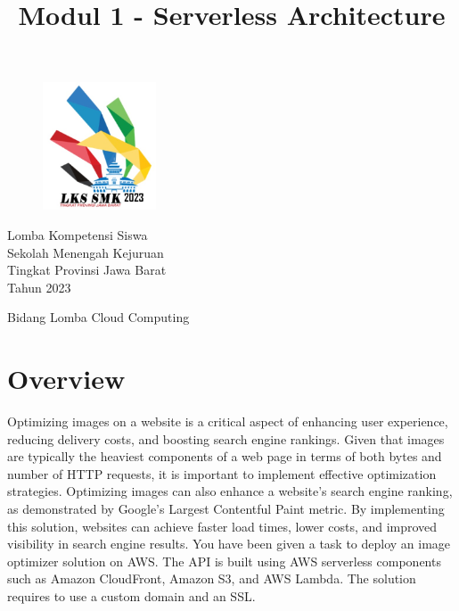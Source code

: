\documentclass{article}
\title{Modul 1 - Serverless Architecture}
\author{}
\begin{document}
\lstset{language=Bash,upquote=true}
\begin{figure}[h]
\centering
\includegraphics[width=0.3\textwidth]{logo_lks_2023.jpg}
\end{figure}
\centering
{\huge
Lomba Kompetensi Siswa\\
Sekolah Menengah Kejuruan\\
Tingkat Provinsi Jawa Barat\\
Tahun 2023\\
\vspace{10mm} %
}
\vspace{30mm} %
{\let\newpage\relax\maketitle}
\vspace{30mm} %
{\LARGE Bidang Lomba Cloud Computing}

\raggedright
\newpage

\section{Overview}
Optimizing images on a website is a critical aspect of enhancing user experience, reducing delivery costs, and boosting search engine rankings.
Given that images are typically the heaviest components of a web page in terms of both bytes and number of HTTP requests, it is important to implement effective optimization strategies.
Optimizing images can also enhance a website's search engine ranking, as demonstrated by Google's Largest Contentful Paint metric.
By implementing this solution, websites can achieve faster load times, lower costs, and improved visibility in search engine results.
You have been given a task to deploy an image optimizer solution on AWS. The API is built using AWS serverless components such as Amazon CloudFront, Amazon S3, and AWS Lambda. The solution requires to use a custom domain and an SSL.
\end{document}
